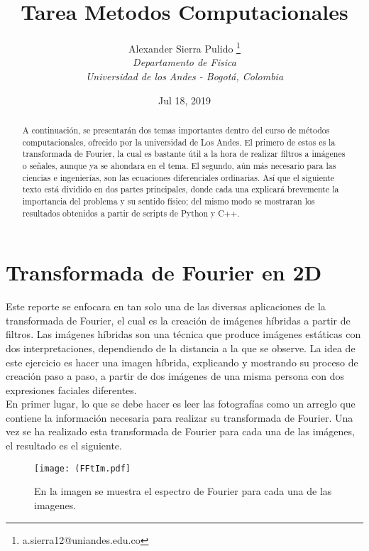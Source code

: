 \documentclass{article}
\title{Tarea Metodos Computacionales}
\author{Alexander Sierra Pulido \thanks {a.sierra12@uniandes.edu.co} \\\textit{{Departamento de Fisica}}\\\textit{{Universidad de los Andes - Bogotá, Colombia }}}
\date{Jul 18, 2019}
\begin{document}
\maketitle
\hrulefill
\begin{abstract}

A continuación, se presentarán dos temas importantes dentro del curso de métodos computacionales, ofrecido por la universidad de Los Andes. El primero de estos es la transformada de Fourier, la cual es bastante útil a la hora de realizar filtros a imágenes o señales, aunque ya se ahondara en el tema. El segundo, aún más necesario para las ciencias e ingenierías, son las ecuaciones diferenciales ordinarias. Así que el siguiente texto está dividido en dos partes principales, donde cada una explicará brevemente la importancia del problema y su sentido físico; del mismo modo se mostraran los resultados obtenidos a partir de scripts de Python y C++.      

\end{abstract}
\hrulefill

\section{Transformada de Fourier en 2D}
Este reporte se enfocara en tan solo una de las diversas aplicaciones de la transformada de Fourier, el cual es la creación de imágenes híbridas a partir de filtros. Las imágenes híbridas son una técnica que produce imágenes estáticas con dos interpretaciones, dependiendo de la distancia a la que se observe. La idea de este ejercicio es hacer una imagen híbrida, explicando y mostrando su proceso de creación paso a paso, a partir de dos imágenes de una misma persona con dos expresiones faciales diferentes.\\ 

En primer lugar, lo que se debe hacer es leer las fotografías como un arreglo que contiene la información necesaria para realizar su transformada de Fourier. Una vez se ha realizado esta transformada de Fourier para cada una de las imágenes, el resultado es el siguiente. 

\begin{figure}[H]
    \centering
    \texttt{[image: (FFtIm.pdf]}
    \caption{En la imagen se muestra el espectro de Fourier para cada una de las imagenes.}
    \label{fig:pos}
\end{figure}
\end{document}

